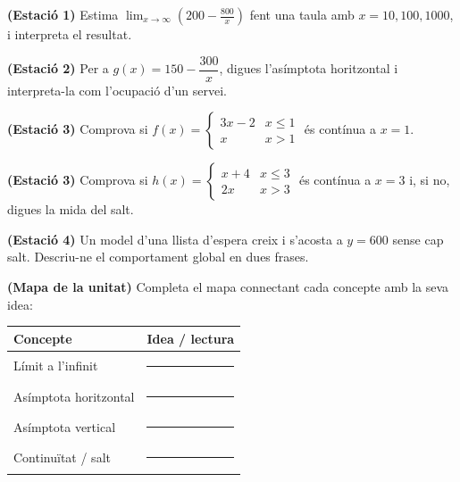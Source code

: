 \begin{exercicis}
\begin{exlist}
  \item \textbf{(Estació 1)} Estima $\displaystyle\lim_{x\to\infty}\left(200-\frac{800}{x}\right)$
        fent una taula amb $x=10,100,1000$, i interpreta el resultat.
  \item \textbf{(Estació 2)} Per a $g(x)=150-\dfrac{300}{x}$, digues l'asímptota
        horitzontal i interpreta-la com l'ocupació d'un servei.
  \item \textbf{(Estació 3)} Comprova si
        $f(x)=\begin{cases}3x-2 & x\le 1\\ x & x>1\end{cases}$ és contínua a $x=1$.
  \item \textbf{(Estació 3)} Comprova si
        $h(x)=\begin{cases}x+4 & x\le 3\\ 2x & x>3\end{cases}$ és contínua a $x=3$ i,
        si no, digues la mida del salt.
  \item \textbf{(Estació 4)} Un model d'una llista d'espera creix i s'acosta a $y=600$
        sense cap salt. Descriu-ne el comportament global en dues frases.
  \item \textbf{(Mapa de la unitat)} Completa el mapa connectant cada concepte amb la
        seva idea:
        \begin{center}
        \renewcommand{\arraystretch}{1.4}
        \begin{tabular}{p{3.8cm} p{8.6cm}}
        \toprule
        \textbf{Concepte} & \textbf{Idea / lectura} \\
        \midrule
        Límit a l'infinit & \rule{7.8cm}{0.4pt} \\
        Asímptota horitzontal & \rule{7.8cm}{0.4pt} \\
        Asímptota vertical & \rule{7.8cm}{0.4pt} \\
        Continuïtat / salt & \rule{7.8cm}{0.4pt} \\
        \bottomrule
        \end{tabular}
        \end{center}
\end{exlist}
\end{exercicis}

